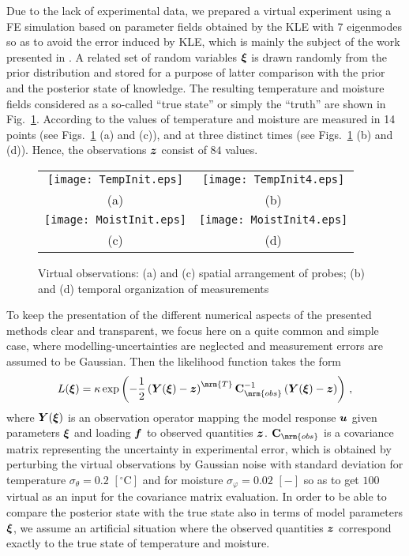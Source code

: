 \documentclass[preprint,12pt]{elsarticle}
\newcommand{\vek}[1]{\mathchoice{\displaystyle\boldsymbol#1}
{\textstyle\boldsymbol#1}{\scriptstyle\boldsymbol#1}
{\scriptscriptstyle\boldsymbol#1}}
\newcommand{\mat}[1]{\mathchoice{\displaystyle\mathbf#1}
{\textstyle\mathbf#1}{\scriptstyle\mathbf#1}
{\scriptscriptstyle\mathbf#1}}
\begin{document}
Due to the lack of experimental data, we prepared a virtual
experiment using a FE simulation based on parameter fields
obtained by the KLE with $7$ eigenmodes so as to avoid the error
induced by KLE, which is mainly the subject of the work presented
in \cite{Kucerova:2011:AMC}. A related set of random variables
  $\vek{\xi}$ is drawn randomly from the prior distribution and stored
  for a purpose of latter comparison with the prior and the posterior
  state of knowledge. The resulting temperature and moisture fields
  considered as a so-called ``true state'' or simply the ``truth'' are
  shown in Fig.~\ref{fig_observations}. According to
\cite{Kucerova:2011:AMC} the values of temperature and moisture
are measured in 14 points (see Figs.~\ref{fig_observations} (a)
and (c)), and at three distinct times (see
Figs.~\ref{fig_observations} (b) and (d)). Hence, the observations
$\vek{z}$ consist of $84$ values.
\begin{figure} [ht!]
\centering
\begin{tabular}{cc}
\texttt{[image: TempInit.eps]}&
\texttt{[image: TempInit4.eps]}\\
(a)&(b)\\
\texttt{[image: MoistInit.eps]}&
\texttt{[image: MoistInit4.eps]}\\
(c)&(d)
\end{tabular}
\caption{Virtual observations: (a) and (c) spatial arrangement of
  probes; (b) and (d) temporal organization of measurements}
\label{fig_observations}
\end{figure}
To keep the presentation of the different numerical aspects of the
presented methods clear and transparent, we focus here on a quite
common and simple case, where modelling-uncertainties are
neglected and measurement errors are assumed to be Gaussian. Then
the likelihood function takes the form
\begin{equation}
  L({\vek{\xi}}) = \kappa\exp \left( - \frac{1}{2} \left(
      \vek{Y}({\vek{\xi}}) - \vek{z} \right)^{\mrm{T}} \mat{C}^{-1}_{\mrm{obs}}
    \left( \vek{Y}({\vek{\xi}}) - \vek{z} \right) \right) \, ,
\label{eq_likeli}
\end{equation}
where $\vek{Y}(\vek{\xi})$ is an observation operator mapping the
model response $\vek{u}$ given parameters $\vek{\xi}$ and loading
$\vek{f}$ to observed quantities $\vek{z}$. $\mat{C}_{\mrm{obs}}$
is a covariance matrix representing the uncertainty in
experimental error, which is obtained by perturbing the virtual
observations by Gaussian noise with standard deviation for
temperature $\sigma_{\theta} = 0.2$ $\mathrm{[^{\circ}C]}$ and for
moisture $\sigma_{\varphi} = 0.02$ $\mathrm{[-]}$ so as to get
$100$ virtual as an input for the covariance matrix evaluation. In
order to be able to compare the posterior state with the true
state also in terms of model parameters $\vek{\xi}$, we assume an
artificial situation where the observed quantities $\vek{z}$
correspond exactly to the true state of temperature and moisture.
\end{document}
